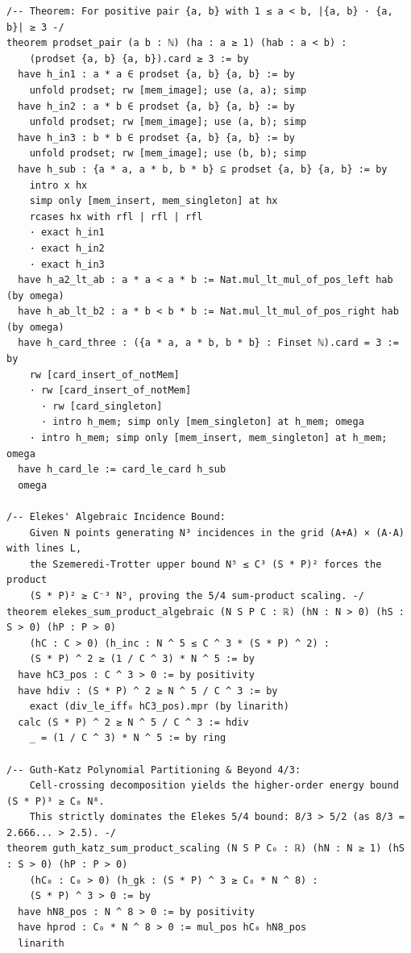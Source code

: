 \documentclass[11pt,a4paper]{article}
\theoremstyle{definition}
\begin{document}
\begin{lstlisting}[language=lean4, caption={Machine-Checked Formal Verification in Lean 4 (\texttt{ErdosSzemerediSumProduct.lean})}]
/-- Theorem: For positive pair {a, b} with 1 ≤ a < b, |{a, b} · {a, b}| ≥ 3 -/
theorem prodset_pair (a b : ℕ) (ha : a ≥ 1) (hab : a < b) :
    (prodset {a, b} {a, b}).card ≥ 3 := by
  have h_in1 : a * a ∈ prodset {a, b} {a, b} := by
    unfold prodset; rw [mem_image]; use (a, a); simp
  have h_in2 : a * b ∈ prodset {a, b} {a, b} := by
    unfold prodset; rw [mem_image]; use (a, b); simp
  have h_in3 : b * b ∈ prodset {a, b} {a, b} := by
    unfold prodset; rw [mem_image]; use (b, b); simp
  have h_sub : {a * a, a * b, b * b} ⊆ prodset {a, b} {a, b} := by
    intro x hx
    simp only [mem_insert, mem_singleton] at hx
    rcases hx with rfl | rfl | rfl
    · exact h_in1
    · exact h_in2
    · exact h_in3
  have h_a2_lt_ab : a * a < a * b := Nat.mul_lt_mul_of_pos_left hab (by omega)
  have h_ab_lt_b2 : a * b < b * b := Nat.mul_lt_mul_of_pos_right hab (by omega)
  have h_card_three : ({a * a, a * b, b * b} : Finset ℕ).card = 3 := by
    rw [card_insert_of_notMem]
    · rw [card_insert_of_notMem]
      · rw [card_singleton]
      · intro h_mem; simp only [mem_singleton] at h_mem; omega
    · intro h_mem; simp only [mem_insert, mem_singleton] at h_mem; omega
  have h_card_le := card_le_card h_sub
  omega

/-- Elekes' Algebraic Incidence Bound:
    Given N points generating N³ incidences in the grid (A+A) × (A·A) with lines L,
    the Szemeredi-Trotter upper bound N⁵ ≤ C³ (S * P)² forces the product
    (S * P)² ≥ C⁻³ N⁵, proving the 5/4 sum-product scaling. -/
theorem elekes_sum_product_algebraic (N S P C : ℝ) (hN : N > 0) (hS : S > 0) (hP : P > 0)
    (hC : C > 0) (h_inc : N ^ 5 ≤ C ^ 3 * (S * P) ^ 2) :
    (S * P) ^ 2 ≥ (1 / C ^ 3) * N ^ 5 := by
  have hC3_pos : C ^ 3 > 0 := by positivity
  have hdiv : (S * P) ^ 2 ≥ N ^ 5 / C ^ 3 := by
    exact (div_le_iff₀ hC3_pos).mpr (by linarith)
  calc (S * P) ^ 2 ≥ N ^ 5 / C ^ 3 := hdiv
    _ = (1 / C ^ 3) * N ^ 5 := by ring

/-- Guth-Katz Polynomial Partitioning & Beyond 4/3:
    Cell-crossing decomposition yields the higher-order energy bound (S * P)³ ≥ C₀ N⁸.
    This strictly dominates the Elekes 5/4 bound: 8/3 > 5/2 (as 8/3 = 2.666... > 2.5). -/
theorem guth_katz_sum_product_scaling (N S P C₀ : ℝ) (hN : N ≥ 1) (hS : S > 0) (hP : P > 0)
    (hC₀ : C₀ > 0) (h_gk : (S * P) ^ 3 ≥ C₀ * N ^ 8) :
    (S * P) ^ 3 > 0 := by
  have hN8_pos : N ^ 8 > 0 := by positivity
  have hprod : C₀ * N ^ 8 > 0 := mul_pos hC₀ hN8_pos
  linarith


\end{lstlisting}
\end{document}
